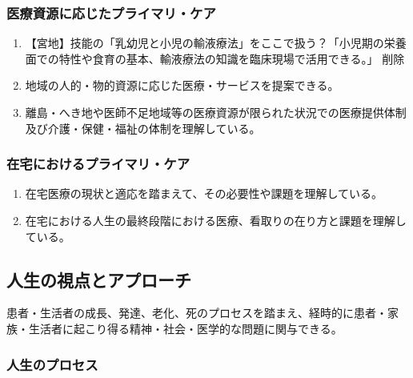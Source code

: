 \documentclass[
]{ltjsarticle}
\providecommand{\tightlist}{%
  \setlength{\itemsep}{0pt}\setlength{\parskip}{0pt}}
\begin{document}
\hypertarget{ux533bux7642ux8cc7ux6e90ux306bux5fdcux3058ux305fux30d7ux30e9ux30a4ux30deux30eaux30b1ux30a2}{%
\subsubsection{医療資源に応じたプライマリ・ケア}\label{ux533bux7642ux8cc7ux6e90ux306bux5fdcux3058ux305fux30d7ux30e9ux30a4ux30deux30eaux30b1ux30a2}}

\begin{enumerate}
\def\labelenumi{\arabic{enumi}.}
\tightlist
\item
  【宮地】技能の「乳幼児と小児の輸液療法」をここで扱う？「小児期の栄養面での特性や食育の基本、輸液療法の知識を臨床現場で活用できる。」
  削除
\item
  地域の人的・物的資源に応じた医療・サービスを提案できる。
\item
  離島・へき地や医師不足地域等の医療資源が限られた状況での医療提供体制及び介護・保健・福祉の体制を理解している。
\end{enumerate}

\hypertarget{ux5728ux5b85ux306bux304aux3051ux308bux30d7ux30e9ux30a4ux30deux30eaux30b1ux30a2}{%
\subsubsection{在宅におけるプライマリ・ケア}\label{ux5728ux5b85ux306bux304aux3051ux308bux30d7ux30e9ux30a4ux30deux30eaux30b1ux30a2}}

\begin{enumerate}
\def\labelenumi{\arabic{enumi}.}
\tightlist
\item
  在宅医療の現状と適応を踏まえて、その必要性や課題を理解している。
\item
  在宅における人生の最終段階における医療、看取りの在り方と課題を理解している。
\end{enumerate}

\hypertarget{ux4ebaux751fux306eux8996ux70b9ux3068ux30a2ux30d7ux30edux30fcux30c1}{%
\subsection{人生の視点とアプローチ}\label{ux4ebaux751fux306eux8996ux70b9ux3068ux30a2ux30d7ux30edux30fcux30c1}}

患者・生活者の成長、発達、老化、死のプロセスを踏まえ、経時的に患者・家族・生活者に起こり得る精神・社会・医学的な問題に関与できる。

\hypertarget{ux4ebaux751fux306eux30d7ux30edux30bbux30b9}{%
\subsubsection{人生のプロセス}\label{ux4ebaux751fux306eux30d7ux30edux30bbux30b9}}
\end{document}
